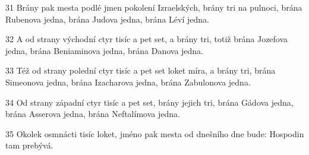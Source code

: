 \par 31 Brány pak mesta podlé jmen pokolení Izraelských, brány tri na pulnoci, brána Rubenova jedna, brána Judova jedna, brána Léví jedna.
\par 32 A od strany východní ctyr tisíc a pet set, a brány tri, totiž brána Jozefova jedna, brána Beniaminova jedna, brána Danova jedna.
\par 33 Též od strany polední ctyr tisíc a pet set loket míra, a brány tri, brána Simeonova jedna, brána Izacharova jedna, brána Zabulonova jedna.
\par 34 Od strany západní ctyr tisíc a pet set, brány jejich tri, brána Gádova jedna, brána Asserova jedna, brána Neftalímova jedna.
\par 35 Okolek osmnácti tisíc loket, jméno pak mesta od dnešního dne bude: Hospodin tam prebývá.

